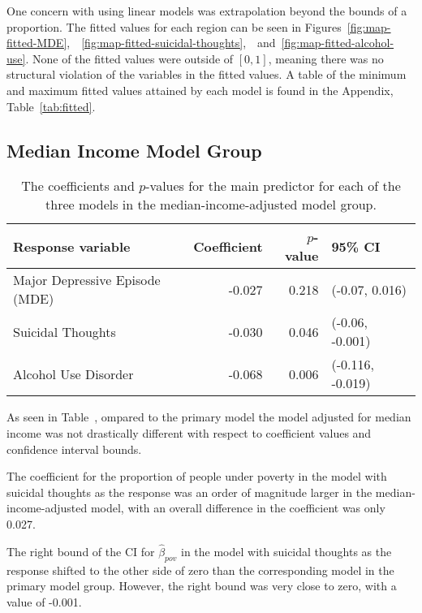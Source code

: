 \documentclass{article}
\begin{document}
One concern with using linear models was extrapolation
beyond the bounds of a proportion.
The fitted values for each region can be seen in
Figures~\ref{fig:map-fitted-MDE},\
~\ref{fig:map-fitted-suicidal-thoughts},\
~and~\ref{fig:map-fitted-alcohol-use}.
None of the fitted values were outside of $[0,1]$,
meaning there was no structural violation of the
variables in the fitted values.
A table of the minimum and maximum fitted values
attained by each model is found in the Appendix,
Table~\ref{tab:fitted}.


\subsection{Median Income Model Group}

\begin{table}[!htb]
\begin{center}
\begin{tabular}{l r r l}
    \toprule
    Response variable & Coefficient & $p$-value & 95\% CI\\
    \midrule
    Major Depressive Episode (MDE) & -0.027 & 0.218 & (-0.07, 0.016)\\
    Suicidal Thoughts & -0.030 & 0.046 & (-0.06, -0.001)\\
    Alcohol Use Disorder & -0.068 & 0.006 & (-0.116, -0.019)\\
    \bottomrule
\end{tabular}
\caption{\label{tab:median-income-model-results} The coefficients and $p$-values
    for the main predictor for each of the three models
    in the median-income-adjusted model group.
}
\end{center}
\end{table}

As seen in Table~\label{tab:median-income-model-results},
ompared to the primary model the model adjusted for median income
was not drastically different with respect to coefficient values and
confidence interval bounds.

The coefficient for the proportion of people under
poverty in the model with suicidal thoughts as the response
was an order of magnitude larger in the median-income-adjusted model,
with an overall difference in the coefficient was only 0.027.

The right bound of the CI for $\hat{\beta}_{pov}$ in the
model with suicidal thoughts as the response
shifted to the other side of zero than the corresponding model
in the primary model group.
However, the right bound was very close to zero,
with a value of -0.001.
\end{document}
